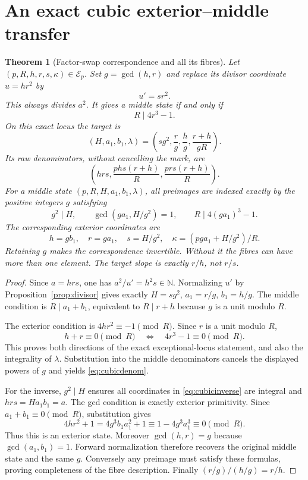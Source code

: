 \documentclass[11pt]{article}
\newtheorem{theorem}{Theorem}[section]
\theoremstyle{remark}\newtheorem{remark}[theorem]{Remark}
\newcommand{\N}{\mathbb N}
\newcommand{\E}{\mathcal E}
\begin{document}
\section{An exact cubic exterior--middle transfer}\label{sec:cubic}
\begin{theorem}[Factor-swap correspondence and all its fibres]\label{thm:cubic}
Let $(p,R,h,r,s,\kappa)\in\E_p$. Set $g=\gcd(h,r)$ and replace its divisor coordinate $u=hr^2$ by
\[
 u'=sr^2.
\]
This always divides $a^2$. It gives a middle state if and only if
\begin{equation}\label{eq:cubic}
 R\mid4r^3-1.
\end{equation}
On this exact locus the target is
\begin{equation}\label{eq:cubicmap}
 (H,a_1,b_1,\lambda)=
 \left(sg^2,\frac r g,\frac h g,\frac{r+h}{gR}\right).
\end{equation}
Its raw denominators, without cancelling the mark, are
\begin{equation}\label{eq:cubicdenom}
 \left(hrs,\frac{phs(r+h)}R,\frac{prs(r+h)}R\right).
\end{equation}
For a middle state $(p,R,H,a_1,b_1,\lambda)$, all preimages are indexed exactly by the positive integers $g$ satisfying
\begin{equation}\label{eq:cubicfibre}
 g^2\mid H,\qquad \gcd(ga_1,H/g^2)=1,\qquad
 R\mid4(ga_1)^3-1.
\end{equation}
The corresponding exterior coordinates are
\begin{equation}\label{eq:cubicinverse}
 h=gb_1,\quad r=ga_1,\quad s=H/g^2,\quad
 \kappa=(pga_1+H/g^2)/R.
\end{equation}
Retaining $g$ makes the correspondence invertible. Without it the fibres can have more than one element. The target slope is exactly $r/h$, not $r/s$.
\end{theorem}
\begin{proof}
Since $a=hrs$, one has $a^2/u'=h^2s\in\N$. Normalizing $u'$ by Proposition~\ref{prop:divisor} gives exactly $H=sg^2$, $a_1=r/g$, $b_1=h/g$. The middle condition is $R\mid a_1+b_1$, equivalent to $R\mid r+h$ because $g$ is a unit modulo $R$.

The exterior condition is $4hr^2\equiv-1\pmod R$. Since $r$ is a unit modulo $R$,
\[
 h+r\equiv0\pmod R
 \quad\Longleftrightarrow\quad
 4r^3-1\equiv0\pmod R.
\]
This proves both directions of the exact exceptional-locus statement, and also the integrality of $\lambda$. Substitution into the middle denominators cancels the displayed powers of $g$ and yields \eqref{eq:cubicdenom}.

For the inverse, $g^2\mid H$ ensures all coordinates in \eqref{eq:cubicinverse} are integral and $hrs=Ha_1b_1=a$. The gcd condition is exactly exterior primitivity. Since $a_1+b_1\equiv0\pmod R$, substitution gives
\[
 4hr^2+1=4g^3b_1a_1^2+1
 \equiv1-4g^3a_1^3\equiv0\pmod R.
\]
Thus this is an exterior state. Moreover $\gcd(h,r)=g$ because $\gcd(a_1,b_1)=1$. Forward normalization therefore recovers the original middle state and the same $g$. Conversely any preimage must satisfy these formulas, proving completeness of the fibre description. Finally $(r/g)/(h/g)=r/h$.
\end{proof}
\end{document}

